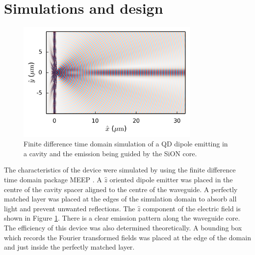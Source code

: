 \section{Simulations and design}

\begin{figure}[h!] \begin{center}
\includegraphics[width=0.8\textwidth]{images/sim.png} \caption{Finite difference
time domain simulation of a QD dipole emitting in a cavity and the emission
being guided by the SiON core.} \label{fig:sim} \end{center} \end{figure}

The characteristics of the device were simulated by using the finite difference
time domain package MEEP \cite{oskooi2010meep, mandelshtam1997harmonic}. A
$\hat{z}$ oriented dipole emitter was placed in the centre of the cavity spacer
aligned to the centre of the waveguide. A perfectly matched layer was placed at
the edges of the simulation domain to absorb all light and prevent unwanted
reflections. The $\hat{z}$ component of the electric field is shown in Figure
\ref{fig:sim}. There is a clear emission pattern along the waveguide core. The
efficiency of this device was also determined theoretically. A bounding box
which records the Fourier transformed fields was placed at the edge of the
domain and just inside the perfectly matched layer.

